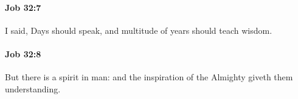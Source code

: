 		\paragraph{Job 32:7} %
			\label{JOB-32-7}

			I said, Days should speak, and multitude of years should teach wisdom.


		\paragraph{Job 32:8} %
			\label{JOB-32-8}

			But there is a spirit in man: and the inspiration of the Almighty giveth them understanding.


